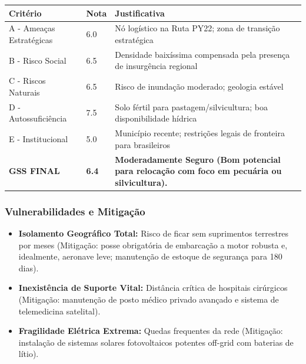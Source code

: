 \begin{table}[ht!]
\small \begin{tabular}{p{3.0cm}p{0.8cm}p{6.0cm}} \toprule
\textbf{Critério} & \textbf{Nota} & \textbf{Justificativa} \\ \midrule
A - Ameaças Estratégicas & 6.0 & Nó logístico na Ruta PY22; zona de transição estratégica \\
B - Risco Social & 6.5 & Densidade baixíssima compensada pela presença de insurgência regional \\
C - Riscos Naturais & 6.5 & Risco de inundação moderado; geologia estável \\
D - Autossuficiência & 7.5 & Solo fértil para pastagem/\allowbreak \allowbreak silvicultura; boa disponibilidade hídrica \\
E - Institucional & 5.0 & Município recente; restrições legais de fronteira para brasileiros \\
\midrule \textbf{GSS FINAL} & \textbf{6.4} & \textbf{Moderadamente Seguro (Bom potencial para relocação com foco em pecuária ou silvicultura).} \\ \bottomrule \end{tabular}
\end{table}
\subsubsection{Vulnerabilidades e
Mitigação}

\begin{itemize}
\tightlist
\item
  \textbf{Isolamento Geográfico Total:} Risco de ficar sem suprimentos
  terrestres por meses (Mitigação: posse obrigatória de embarcação a
  motor robusta e, idealmente, aeronave leve; manutenção de estoque de
  segurança para 180 dias).
\item
  \textbf{Inexistência de Suporte Vital:} Distância crítica de hospitais
  cirúrgicos (Mitigação: manutenção de posto médico privado avançado e
  sistema de telemedicina satelital).
\item
  \textbf{Fragilidade Elétrica Extrema:} Quedas frequentes da rede
  (Mitigação: instalação de sistemas solares fotovoltaicos potentes
  off-grid com baterias de lítio).
\end{itemize}

